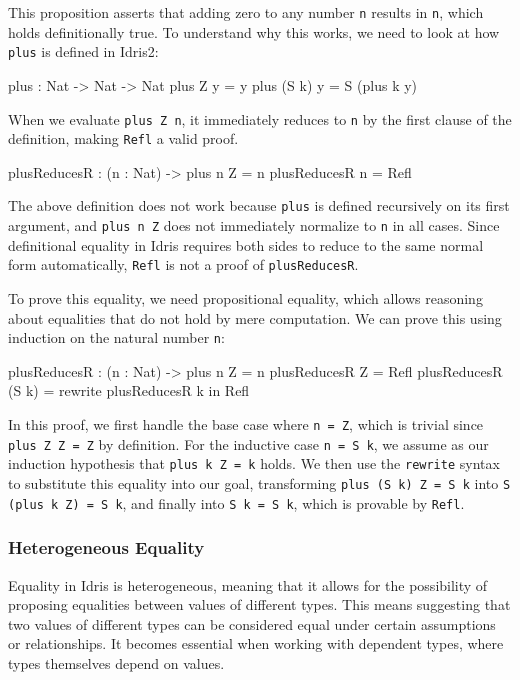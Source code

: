 \documentclass[]{rptuseminar}
\begin{document}
This proposition asserts that adding zero to any number \texttt{n} results in \texttt{n}, which holds definitionally true. To understand why this works, we need to look at how \texttt{plus} is defined in Idris2:

\begin{idris}
plus : Nat -> Nat -> Nat
plus Z y = y
plus (S k) y = S (plus k y)
\end{idris}

When we evaluate \texttt{plus Z n}, it immediately reduces to \texttt{n} by the first clause of the definition, making \texttt{Refl} a valid proof.

\begin{idris}
plusReducesR : (n : Nat) -> plus n Z = n
plusReducesR n = Refl
\end{idris}
The above definition does not work because \texttt{plus} is defined recursively on its first argument, and \texttt{plus n Z} does not immediately normalize to \texttt{n} in all cases. Since definitional equality in Idris requires both sides to reduce to the same normal form automatically, \texttt{Refl} is not a proof of \texttt{plusReducesR}.

To prove this equality, we need propositional equality, which allows reasoning about equalities that do not hold by mere computation. We can prove this using induction on the natural number \texttt{n}:

\begin{idris}
plusReducesR : (n : Nat) -> plus n Z = n
plusReducesR Z = Refl 
plusReducesR (S k) = rewrite plusReducesR k in Refl  
\end{idris}

In this proof, we first handle the base case where \texttt{n = Z}, which is trivial since \texttt{plus Z Z = Z} by definition. For the inductive case \texttt{n = S k}, we assume as our induction hypothesis that \texttt{plus k Z = k} holds. We then use the \texttt{rewrite} syntax to substitute this equality into our goal, transforming \texttt{plus (S k) Z = S k} into \texttt{S (plus k Z) = S k}, and finally into \texttt{S k = S k}, which is provable by \texttt{Refl}.

\subsubsection{Heterogeneous Equality}
Equality in Idris is heterogeneous, meaning that it allows for the possibility of proposing equalities between values of different types. This means suggesting that two values of different types can be considered equal under certain assumptions or relationships. It becomes essential when working with dependent types, where types themselves depend on values.
\end{document}

